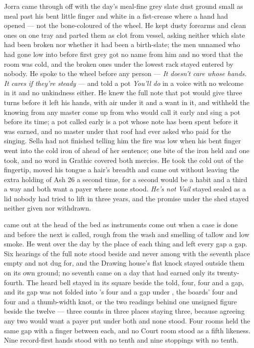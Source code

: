 Jorra came through  off  with the day's meal-fine grey slate dust ground small as meal past his bent little finger and white in a fist-crease where a hand had opened --- not the bone-coloured  of the wheel. He kept dusty forearms and clean ones on one tray and parted them as clot from vessel, asking neither which slate had been broken nor whether it had been a birth-slate; the men unnamed who had gone low into  before first grey got no name from him and no word that the room was cold, and the broken ones under the lowest rack stayed entered by nobody. He spoke to the wheel before any person --- \emph{It doesn't care whose hands. It cares if they're steady} --- and told a pot \emph{You'll do} in a voice with no welcome in it and no unkindness either. He knew the full note that pot would give three turns before it left his hands, with air under it and a want in it, and withheld the knowing from any master come up from  who would call it early and sing a pot before its time; a pot called early is a pot whose note has been spent before it was earned, and no master under that roof had ever asked who paid for the singing. Sella had not finished telling him the fire was low when his bent finger went into the cold iron of  ahead of her sentence; one bite of the iron held and one took, and no word in Grathic covered both mercies. He took the cold out of the fingertip, moved his tongue a hair's breadth and came out without leaving the extra holding of Ash 26 a second time, for a second would be a habit and a third a way and both want a payer where none stood. \emph{He's not Vail} stayed sealed as a lid nobody had tried to lift in three years, and the promise under the shed stayed neither given nor withdrawn.

\scenebreak

 came out at the head of the bed as instruments come out when a case is done and before the next is called, rough from the wash and smelling of tallow and low smoke. He went over the day by the place of each thing and left every gap a gap. Six hearings of the full note stood beside and never among with the seventh place empty and not dug for, and the Drawing house's flat knock stayed outside them on its own ground; no seventh came on a day that had earned only its twenty-fourth. The heard bell stayed in its square beside the told, four, four and a gap, and its gap was not folded into 's four and a gap under , the boards' four and four and a thumb-width knot, or the two readings behind one unsigned figure beside the twelve --- three counts in three places staying three, because agreeing any two would want a payer put under both and none stood. Four rooms held the same gap with a finger between each, and no Court room stood as a fifth likeness. Nine record-first hands stood with no tenth and nine stoppings with no tenth.

